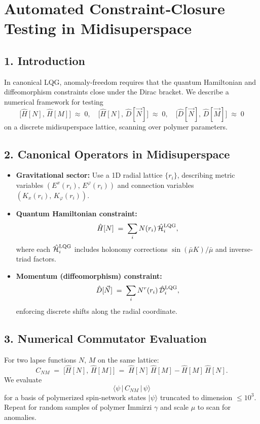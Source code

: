 \documentclass[12pt]{article}
\begin{document}
\section*{Automated Constraint‐Closure Testing in Midisuperspace}

\subsection*{1. Introduction}
In canonical LQG, anomaly‐freedom requires that the quantum Hamiltonian and diffeomorphism constraints close under the Dirac bracket.  We describe a numerical framework for testing 
\[
  \bigl[\hat{H}[N],\,\hat{H}[M]\bigr]\;\approx\;0, 
  \quad 
  \bigl[\hat{H}[N],\,\hat{D}[\vec{N}]\bigr]\;\approx\;0,
  \quad 
  \bigl[\hat{D}[\vec{N}],\,\hat{D}[\vec{M}]\bigr]\;\approx\;0
\]
on a discrete midisuperspace lattice, scanning over polymer parameters.

\subsection*{2. Canonical Operators in Midisuperspace}
\begin{itemize}
  \item \textbf{Gravitational sector:} Use a 1D radial lattice $\{r_i\}$, describing metric variables $(E^x(r_i),\,E^\varphi(r_i))$ and connection variables $(K_x(r_i),\,K_\varphi(r_i))$.  
  \item \textbf{Quantum Hamiltonian constraint:} 
    \[
      \hat{H}[N] \;=\; \sum_{i}N(r_i)\,\hat{\mathcal{H}}_i^{\rm LQG},
    \]
    where each $\hat{\mathcal{H}}_i^{\rm LQG}$ includes holonomy corrections $\sin(\bar\mu K)/\bar\mu$ and inverse‐triad factors.  
  \item \textbf{Momentum (diffeomorphism) constraint:} 
    \[
      \hat{D}[\vec{N}] \;=\; \sum_{i}N^r(r_i)\,\hat{\mathcal{D}}_i^{\rm LQG},
    \]
    enforcing discrete shifts along the radial coordinate.
\end{itemize}

\subsection*{3. Numerical Commutator Evaluation}
For two lapse functions $N,\,M$ on the same lattice:
\[
  C_{NM} \;=\; \bigl[\hat{H}[N],\,\hat{H}[M]\bigr] \;=\; \hat{H}[N]\,\hat{H}[M] - \hat{H}[M]\,\hat{H}[N].
\]
We evaluate 
\[
  \langle \psi\,|\,C_{NM}\,|\,\psi\rangle
\]
for a basis of polymerized spin‐network states $|\psi\rangle$ truncated to dimension $\leq 10^3$.  Repeat for random samples of polymer Immirzi $\gamma$ and scale $\mu$ to scan for anomalies.
\end{document}
